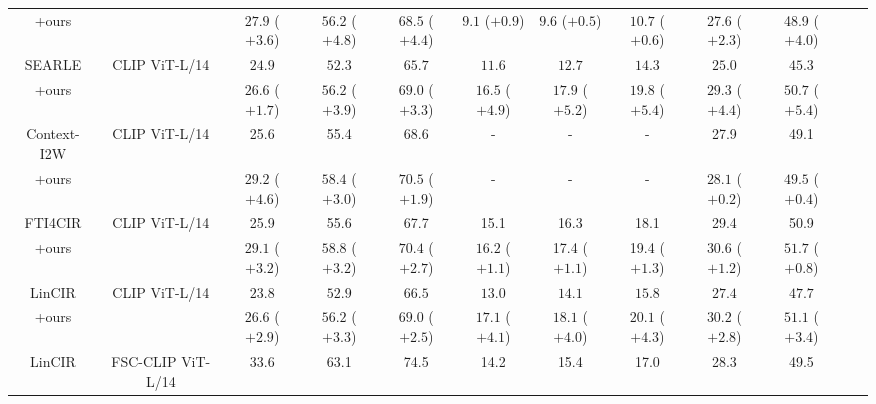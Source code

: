 {\begin{tabular}{c|ccccccccccc}
     +ours  &   & $27.9$ \color{violet}($\mathbf{+3.6}$) & $56.2$ \color{violet}($\mathbf{+4.8}$) & $68.5$ \color{violet}($\mathbf{+4.4}$) & $9.1$ \color{violet}($\mathbf{+0.9}$) & $9.6$ \color{violet}($\mathbf{+0.5}$) & $10.7$ \color{violet}($\mathbf{+0.6}$) & 27.6 \color{violet}($\mathbf{+2.3}$) & 48.9 \color{violet}($\mathbf{+4.0}$) \\
    SEARLE \citep{searle} & CLIP ViT-L/14   & $24.9$ & $52.3$ & $65.7$ & $11.6$ & $12.7$ & $14.3$ & $25.0$ & $45.3$  \\
   \rowcolor{gray!20} +ours  & & $26.6$ \color{violet}($\mathbf{+1.7}$) & $56.2$ \color{violet}($\mathbf{+3.9}$) & $69.0$ \color{violet}($\mathbf{+3.3}$) & $16.5$ \color{violet}($\mathbf{+4.9}$) & $17.9$ \color{violet}($\mathbf{+5.2}$) & $19.8$ \color{violet}($\mathbf{+5.4}$) & $29.3$ \color{violet}($\mathbf{+4.4}$) & $50.7$ \color{violet}($\mathbf{+5.4}$) \\
    Context-I2W \citep{Context-I2W} & CLIP ViT-L/14  & 25.6 & 55.4 & 68.6 & - & - & - & 27.9 & 49.1  \\
    \rowcolor{gray!20} +ours  &   & $29.2$ \color{violet}($\mathbf{+4.6}$) & $58.4$ \color{violet}($\mathbf{+3.0}$) & $70.5$ \color{violet}($\mathbf{+1.9}$)& - & - & -& $28.1$ \color{violet}($\mathbf{+0.2}$)& $49.5$ \color{violet}($\mathbf{+0.4}$)  \\
    FTI4CIR \citep{FTI4CIR} & CLIP ViT-L/14  & 25.9 & 55.6 & 67.7 & 15.1 & 16.3 & 18.1 & 29.4 & 50.9  \\
   \rowcolor{gray!20} +ours  &   & $29.1$ \color{violet}($\mathbf{+3.2}$) & $58.8$ \color{violet}($\mathbf{+3.2}$)   & $70.4$ \color{violet}($\mathbf{+2.7}$) & $16.2$ \color{violet}($\mathbf{+1.1}$) & 17.4 \color{violet}($\mathbf{+1.1}$) & 19.4 \color{violet}($\mathbf{+1.3}$) & $30.6$ \color{violet}($\mathbf{+1.2}$) & $51.7$ \color{violet}($\mathbf{+0.8}$)  \\
    LinCIR \citep{lincir} & CLIP ViT-L/14 & $23.8$ & $52.9$ & $66.5$ & $13.0$ & $14.1$ & $15.8$  & $27.4$ & $47.7$  \\
    \rowcolor{gray!20} +ours  &  & $26.6$ \color{violet}($\mathbf{+2.9}$) & $56.2$ \color{violet}($\mathbf{+3.3}$) & $69.0$ \color{violet}($\mathbf{+2.5}$) & $17.1$ \color{violet}($\mathbf{+4.1}$) & $18.1$ \color{violet}($\mathbf{+4.0}$) & $20.1$ \color{violet}($\mathbf{+4.3}$)  & $30.2$ \color{violet}($\mathbf{+2.8}$) & $51.1$ \color{violet}($\mathbf{+3.4}$) \\
    LinCIR \citep{lincir} & FSC-CLIP \citep{fsc} ViT-L/14   & 33.6 & 63.1 & 74.5 & 14.2 & 15.4 & 17.0 & 28.3 & 49.5  \\

\end{tabular}}
